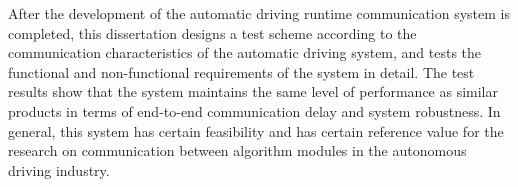 \begin{abstract*}
  After the development of the automatic driving runtime communication system is completed, 
  this dissertation designs a test scheme according to the communication characteristics of the automatic driving system, 
  and tests the functional and non-functional requirements of the system in detail. 
  The test results show that the system maintains the same level of performance as similar products in terms of end-to-end communication delay and system robustness. 
  In general, this system has certain feasibility and has certain reference value for the research on communication between algorithm modules in the autonomous driving industry.
\end{abstract*}
